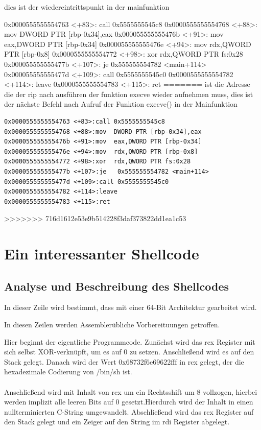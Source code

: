 \documentclass[12pt]{article}
\begin{document}
dies ist der wiedereintrittspunkt in der mainfunktion

0x0000555555554763 <+83>:	call   0x5555555545c8
0x0000555555554768 <+88>:	mov    DWORD PTR [rbp-0x34],eax
0x000055555555476b <+91>:	mov    eax,DWORD PTR [rbp-0x34]
0x000055555555476e <+94>:	mov    rdx,QWORD PTR [rbp-0x8]
0x0000555555554772 <+98>:	xor    rdx,QWORD PTR fs:0x28
0x000055555555477b <+107>:	je     0x555555554782 <main+114>
0x000055555555477d <+109>:	call   0x5555555545c0
0x0000555555554782 <+114>:	leave  
0x0000555555554783 <+115>:	ret    
=======
ist die Adresse die der rip nach ausführen der funktion execve wieder aufnehmen muss,
dies ist der nächste Befehl nach Aufruf der Funktion execve() in der Mainfunktion
\begin{lstlisting}
0x0000555555554763 <+83>:call 0x5555555545c8
0x0000555555554768 <+88>:mov  DWORD PTR [rbp-0x34],eax
0x000055555555476b <+91>:mov  eax,DWORD PTR [rbp-0x34]
0x000055555555476e <+94>:mov  rdx,QWORD PTR [rbp-0x8]
0x0000555555554772 <+98>:xor  rdx,QWORD PTR fs:0x28
0x000055555555477b <+107>:je   0x555555554782 <main+114>
0x000055555555477d <+109>:call 0x5555555545c0
0x0000555555554782 <+114>:leave  
0x0000555555554783 <+115>:ret    
\end{lstlisting}




>>>>>>> 716d1612e53e9b514228f3daf373822dd1ea1c53

	\section{Ein interessanter Shellcode}
		\subsection{Analyse und Beschreibung des Shellcodes}
			
			In dieser Zeile wird bestimmt, dass mit einer 64-Bit Architektur gearbeitet wird.

					
			In diesen Zeilen werden Assembler\"ubliche Vorbereituungen getroffen.
			
			
			Hier beginnt der eigentliche Programmcode. Zun\"achst wird das rcx Register mit sich selbst XOR-verknüpft, um es auf 0 zu setzen. Anschlie{\ss}end wird es auf den Stack gelegt. Danach wird der Wert 0x68732f6e69622fff in rcx gelegt, der die hexadezimale Codierung von /bin/sh ist.\\
			~\\
			Anschlie{\ss}end wird mit Inhalt von rcx um ein Rechtsshift um 8 vollzogen, hierbei werden implizit alle leeren Bits auf 0 gesetzt.Hierdurch wird der Inhalt in einen nullterminierten C-String umgewandelt. Abschlie{\ss}end wird das rcx Register auf den Stack gelegt und ein Zeiger auf den String im rdi Register abgelegt.
			
\end{document}
